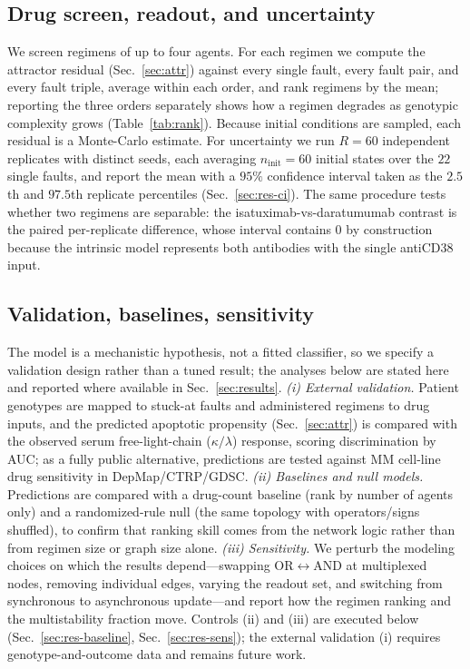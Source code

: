 \documentclass[conference,letterpaper]{IEEEtran}
\begin{document}
\subsection{Drug screen, readout, and uncertainty}\label{sec:screen}
We screen regimens of up to four agents. For each regimen we compute the
attractor residual (Sec.~\ref{sec:attr}) against every single fault, every fault
pair, and every fault triple, average within each order, and rank regimens by the
mean; reporting the three orders separately shows how a regimen degrades as
genotypic complexity grows (Table~\ref{tab:rank}). Because initial conditions are
sampled, each residual is a Monte-Carlo estimate. For uncertainty we run $R=60$
independent replicates with distinct seeds, each averaging $n_{\text{init}}=60$
initial states over the $22$ single faults, and report the mean with a $95\%$
confidence interval taken as the $2.5$th and $97.5$th replicate percentiles
(Sec.~\ref{sec:res-ci}). The same procedure tests whether two regimens are
separable: the isatuximab-vs-daratumumab contrast is the paired per-replicate
difference, whose interval contains $0$ by construction because the intrinsic
model represents both antibodies with the single antiCD38 input.

\subsection{Validation, baselines, sensitivity}\label{sec:val}
The model is a mechanistic hypothesis, not a fitted classifier, so we specify a
validation design rather than a tuned result; the analyses below are stated here
and reported where available in Sec.~\ref{sec:results}.
\emph{(i) External validation.} Patient genotypes are mapped to stuck-at faults
and administered regimens to drug inputs, and the predicted apoptotic propensity
(Sec.~\ref{sec:attr}) is compared with the observed serum free-light-chain
($\kappa/\lambda$) response, scoring discrimination by AUC; as a fully public
alternative, predictions are tested against MM cell-line drug sensitivity in
DepMap/CTRP/GDSC.
\emph{(ii) Baselines and null models.} Predictions are compared with a
drug-count baseline (rank by number of agents only) and a randomized-rule null
(the same topology with operators/signs shuffled), to confirm that ranking skill
comes from the network logic rather than from regimen size or graph size alone.
\emph{(iii) Sensitivity.} We perturb the modeling choices on which the results
depend---swapping OR$\leftrightarrow$AND at multiplexed nodes, removing
individual edges, varying the readout set, and switching from synchronous to
asynchronous update---and report how the regimen ranking and the multistability
fraction move. Controls (ii) and (iii) are executed below (Sec.~\ref{sec:res-baseline}, Sec.~\ref{sec:res-sens}); the external validation (i) requires genotype-and-outcome data and remains future work.
\end{document}
